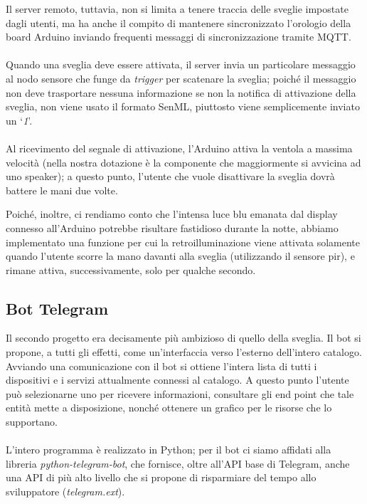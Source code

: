 \documentclass[12pt,a4paper]{article}
\begin{document}
Il server remoto, tuttavia, non si limita a tenere traccia delle sveglie impostate dagli utenti, ma ha anche il compito di mantenere sincronizzato l'orologio della board Arduino inviando frequenti messaggi di sincronizzazione tramite MQTT.
\\ \\
Quando una sveglia deve essere attivata, il server invia un particolare messaggio al nodo sensore che funge da \textit{trigger} per scatenare la sveglia; poiché il messaggio non deve trasportare nessuna informazione se non la notifica di attivazione della sveglia, non viene usato il formato SenML, piuttosto viene semplicemente inviato un `\textit{1}'.
\\ \\
Al ricevimento del segnale di attivazione, l'Arduino attiva la ventola a massima velocità (nella nostra dotazione è la componente che maggiormente si avvicina ad uno speaker); a questo punto, l'utente che vuole disattivare la sveglia dovrà battere le mani due volte.

Poiché, inoltre, ci rendiamo conto che l'intensa luce blu emanata dal display connesso all'Arduino potrebbe risultare fastidioso durante la notte, abbiamo implementato una funzione per cui la retroilluminazione viene attivata solamente quando l'utente scorre la mano davanti alla sveglia (utilizzando il sensore pir), e rimane attiva, successivamente, solo per qualche secondo.

\subsection{Bot Telegram}

Il secondo progetto era decisamente più ambizioso di quello della sveglia. Il bot si propone, a tutti gli effetti, come un'interfaccia verso l'esterno dell'intero catalogo. Avviando una comunicazione con il bot si ottiene l'intera lista di tutti i dispositivi e i servizi attualmente connessi al catalogo. A questo punto l'utente può selezionarne uno per ricevere informazioni, consultare gli end point che tale entità mette a disposizione, nonché ottenere un grafico per le risorse che lo supportano.
\\ \\
L'intero programma è realizzato in Python; per il bot ci siamo affidati alla libreria \textit{python-telegram-bot}, che fornisce, oltre all'API base di Telegram, anche una API di più alto livello che si propone di risparmiare del tempo allo sviluppatore (\textit{telegram.ext}).
\end{document}
